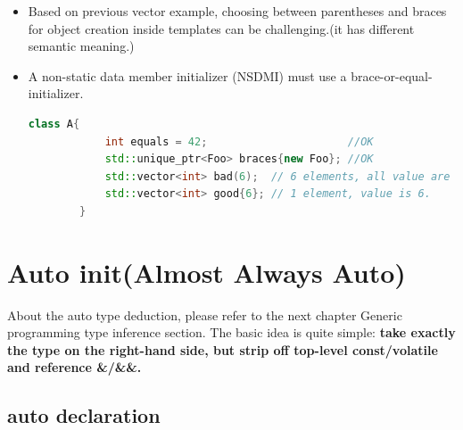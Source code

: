 \documentclass[a4paper,11pt,twoside]{book}
\begin{document}
\begin{itemize}
	\item Based on previous vector example, choosing between parentheses and braces for object creation inside templates can be challenging.(it has different semantic meaning.)
	
	\item A non-static data member initializer (NSDMI) must use a brace-or-equal-initializer.
	\begin{lstlisting}[frame=single, language=c++, mathescape=true]
		class A{
			int equals = 42;                      //OK
			std::unique_ptr<Foo> braces{new Foo}; //OK
			std::vector<int> bad(6);  // 6 elements, all value are 0.
			std::vector<int> good{6}; // 1 element, value is 6. 
		}  
	\end{lstlisting}
	
\end{itemize}


\section{Auto init(Almost Always Auto)}

About the auto type deduction, please refer to the next chapter Generic programming type inference section. The basic idea is quite simple: \newline 
\textbf{take exactly the type on the right-hand side, but strip off top-level const/volatile and reference \&/\&\&.}

\subsection{auto declaration}
\end{document}
